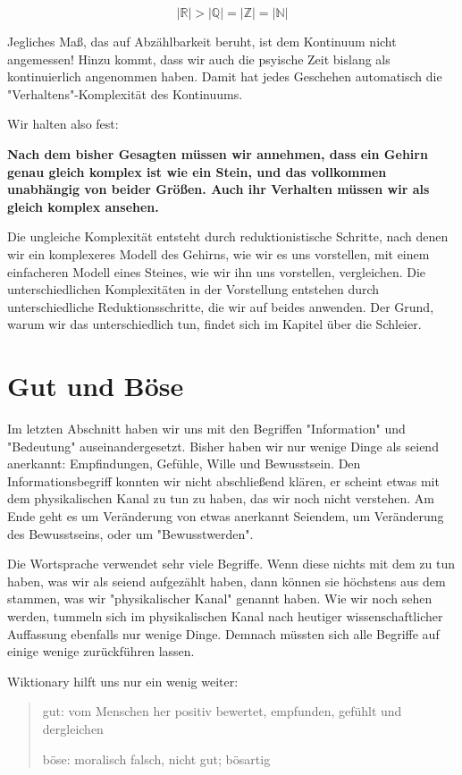 \documentclass[12pt]{book}
\begin{document}
\begin{equation} 
|\mathbb{R}| > |\mathbb{Q}| = |\mathbb{Z}| = |\mathbb{N}|
\label{eq:cardinality_discr}
\end{equation}

Jegliches Maß, das auf Abzählbarkeit beruht, ist dem Kontinuum nicht angemessen! Hinzu kommt, dass wir auch die psyische Zeit bislang als kontinuierlich angenommen haben. Damit hat jedes Geschehen automatisch die "Verhaltens"-Komplexität des Kontinuums.

Wir halten also fest:

\textbf{Nach dem bisher Gesagten müssen wir annehmen, dass ein Gehirn genau gleich komplex ist wie ein Stein, und das vollkommen unabhängig von beider Größen. Auch ihr Verhalten müssen wir als gleich komplex ansehen.} 

Die ungleiche Komplexität entsteht durch reduktionistische Schritte, nach denen wir ein komplexeres Modell des Gehirns, wie wir es uns vorstellen, mit einem einfacheren Modell eines Steines, wie wir ihn uns vorstellen, vergleichen. Die unterschiedlichen Komplexitäten in der Vorstellung entstehen durch unterschiedliche Reduktionsschritte, die wir auf beides anwenden. Der Grund, warum wir das unterschiedlich tun, findet sich im Kapitel über die Schleier. 

\section{Gut und Böse}

Im letzten Abschnitt haben wir uns mit den Begriffen "Information" und "Bedeutung" auseinandergesetzt. Bisher haben wir nur wenige Dinge als seiend anerkannt: Empfindungen, Gefühle, Wille und Bewusstsein. Den Informationsbegriff konnten wir nicht abschließend klären, er scheint etwas mit dem physikalischen Kanal zu tun zu haben, das wir noch nicht  verstehen. Am Ende geht es um Veränderung von etwas anerkannt Seiendem, um Veränderung des Bewusstseins, oder um "Bewusstwerden".

Die Wortsprache verwendet sehr viele Begriffe. Wenn diese nichts mit dem zu tun haben, was wir als seiend aufgezählt haben, dann können sie höchstens aus dem stammen, was wir "physikalischer Kanal" genannt haben. Wie wir noch sehen werden, tummeln sich im physikalischen Kanal nach heutiger wissenschaftlicher Auffassung ebenfalls nur wenige Dinge. Demnach müssten sich alle Begriffe auf einige wenige zurückführen lassen.

Wiktionary hilft uns nur ein wenig weiter:
\begin{quote}\begin{tcolorbox}
gut: vom Menschen her positiv bewertet, empfunden, gefühlt und dergleichen

böse: moralisch falsch, nicht gut; bösartig
\end{tcolorbox}\end{quote}
\end{document}
